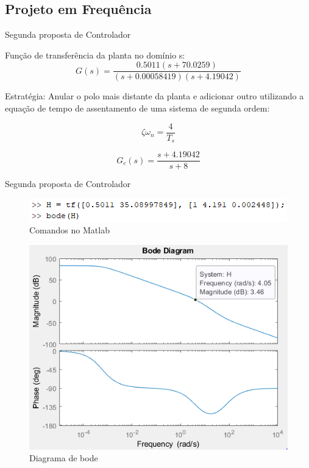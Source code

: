 \documentclass{beamer}
\begin{document}
\subsection{Projeto em Frequência}

\begin{frame}{Segunda proposta de Controlador}

Função de transferência da planta no domínio s:
\begin{equation}
G(s) = \frac{0.5011(s+70.0259)}{(s+0.00058419)(s+4.19042)}
\label{equacao_s}
\end{equation}

Estratégia: Anular o polo mais distante da planta e adicionar outro utilizando a equação de tempo de assentamento de uma sistema de segunda ordem:

\begin{equation}
\zeta \omega_{n}=\frac{4}{T_{s}}
\label{assentamento_eq}
\end{equation}

\begin{equation}
G_{c}(s)=\frac{s+4.19042}{s+8}
\label{novogc}
\end{equation}
\end{frame}

\begin{frame}{Segunda proposta de Controlador}

\begin{figure}[H]
    \centering
    \includegraphics[width=0.7\linewidth]{src/tex/img/bode_comandos.PNG}
    \caption{Comandos no Matlab}
    \label{fig:lgr}
\end{figure}

\begin{figure}[H]
    \centering
    \includegraphics[width=0.6\linewidth]{src/tex/img/bode.PNG}
    \caption{Diagrama de bode}
    \label{fig:lgr}
\end{figure}

\end{frame}
\end{document}
